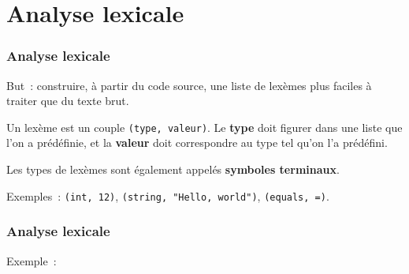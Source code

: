 
\section{Analyse lexicale}
\label{seclexer}


\begin{frame}
    \frametitle{Analyse lexicale}

    But~: construire, à partir du code source, une liste de lexèmes plus faciles
    à traiter que du texte brut.

    \pause

    \begin{definition}[lexème]
      Un lexème est un couple \texttt{(type, valeur)}. Le \textbf{type}
      doit figurer dans une liste que l'on a prédéfinie, et la \textbf{valeur}
      doit correspondre au type tel qu'on l'a prédéfini.

      Les types de lexèmes sont également appelés \textbf{symboles terminaux}.
    \end{definition}

    \pause

    Exemples~: \texttt{(int, 12)},
    \texttt{(string, "Hello, world")}, \texttt{(equals, =)}.

\end{frame}

\begin{frame}
  \frametitle{Analyse lexicale}

  Exemple~:
  
\end{frame}

